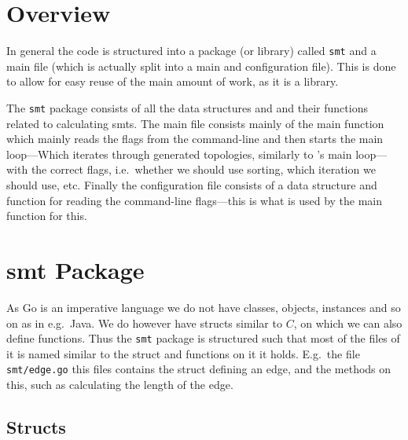 \section{Overview}
\label{sec:overview-1}

In general the code is structured into a package (or library) called
\texttt{smt} and a main file (which is actually split into a main and
configuration file). This is done to allow for easy reuse of the main amount of
work, as it is a library.

The \texttt{smt} package consists of all the data structures and and their
functions related to calculating \acp{smt}. The main file consists mainly of the
main function which mainly reads the flags from the command-line and then starts
the main loop---Which iterates through generated topologies, similarly to
\citeauthor{smith1992}'s main loop---with the correct flags, i.e.\ whether we
should use sorting, which iteration we should use, etc. Finally the
configuration file consists of a data structure and function for reading the
command-line flags---this is what is used by the main function for this.

\section{\acs{smt} Package}
\label{sec:smt-package}

As Go is an imperative language we do not have classes, objects, instances and
so on as in e.g.\ Java. We do however have structs similar to $C$, on which we
can also define functions. Thus the \texttt{smt} package is structured such that
most of the files of it is named similar to the struct and functions on it it
holds. E.g.\ the file \texttt{smt/edge.go} this files contains the struct
defining an edge, and the methods on this, such as calculating the length of the
edge.

\subsection{Structs}
\label{sec:structs}

